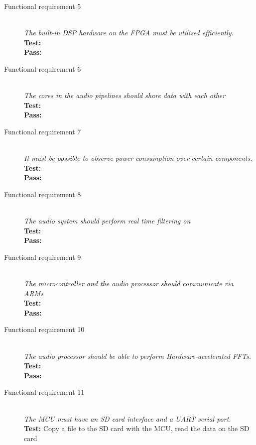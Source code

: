 \begin{description}
    \item[Functional requirement 5] \hfill \\
        \textit{The built-in DSP hardware on the FPGA must be utilized efficiently. } \\
        \textbf{Test:} \\
        \textbf{Pass:} \\
    \item[Functional requirement 6] \hfill \\
        \textit{The cores in the audio pipelines should share data with each other} \\
        \textbf{Test:} \\
        \textbf{Pass:} \\
    \item[Functional requirement 7] \hfill \\
        \textit{It must be possible to observe power consumption over certain components.} \\
        \textbf{Test:} \\
        \textbf{Pass:} \\
    \item[Functional requirement 8] \hfill \\
        \textit{The audio system should perform real time filtering on} \\
        \textbf{Test:} \\
        \textbf{Pass:} \\
    \item[Functional requirement 9] \hfill \\
        \textit{The microcontroller and the audio processor should communicate via ARMs} \\
        \textbf{Test:} \\
        \textbf{Pass:} \\
    \item[Functional requirement 10] \hfill \\
        \textit{The audio processor should be able to perform Hardware-accelerated FFTs.} \\
        \textbf{Test:} \\
        \textbf{Pass:} \\
    \item[Functional requirement 11] \hfill \\
        \textit{The MCU must have an SD card interface and a UART serial port.} \\
        \textbf{Test:} Copy a file to the SD card with the MCU, read the data on the SD card

\end{description}
